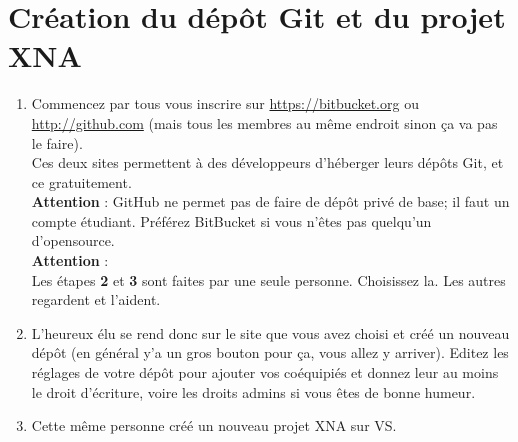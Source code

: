 \documentclass[a4paper]{article}
\begin{document}
\section{Création du  dépôt Git et du projet XNA}


\begin{enumerate}
    \item Commencez par tous vous inscrire sur \url{https://bitbucket.org} ou
    \url{http://github.com} (mais tous les membres au même endroit sinon ça va
    pas le faire). \\
    Ces deux sites permettent à des développeurs d'héberger leurs dépôts Git, et ce
    gratuitement.\\
    \textbf{Attention} : GitHub ne permet pas de faire de dépôt privé
    de base; il faut un compte étudiant. Préférez BitBucket si vous n'êtes pas
    quelqu'un d'opensource.\\

    {\color{red} \textbf{Attention} : \\Les étapes \textbf{2} et \textbf{3}
    sont faites par une seule personne. Choisissez la. Les autres regardent et
    l'aident.}\\

    \item L'heureux élu se rend donc sur le site que vous avez choisi et créé un
    nouveau dépôt (en général y'a un gros bouton pour ça, vous allez y
    arriver). Editez les réglages de votre dépôt pour ajouter vos
    coéquipiés et donnez leur au moins le droit d'écriture, voire les
    droits admins si vous êtes de bonne humeur. \\

    \item Cette même personne créé un nouveau projet XNA sur VS.
\end{enumerate}
\end{document}

